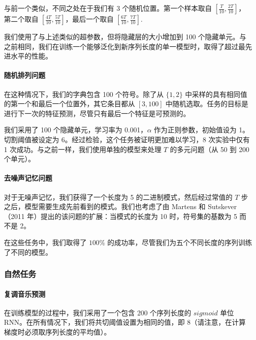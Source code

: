 与前一个类似，不同之处在于我们有 3 个随机位置。第一个样本取自 \([\frac{T}{10},\frac{2T}{10}]\)，第二个取自 \([\frac{4T}{10}, \frac{5T}{10}]\)，最后一个取自 \([\frac{6T}{10},\frac{7T}{10}]\).

我们使用了与上述类似的超参数，但将隐藏层的大小增加到 100 个隐藏单元。与之前相同，我们在训练一个能够泛化到新序列长度的单一模型时，取得了超过最先进水平的性能。

\paragraph{随机排列问题}\label{ux968fux673aux6392ux5217ux95eeux9898}

在这种情况下，我们的字典包含 100 个符号。除了从 \(\{1, 2\}\) 中采样的具有相同值的第一个和最后一个位置外，其它条目都从 \([3,100]\) 中随机选取。任务的目标是进行下一次的特征预测，尽管只有最后一个特征是可预测的。

我们采用了 100 个隐藏单元，学习率为 0.001，\(\alpha\) 作为正则参数，初始值设为 1。切割阈值被设定为 6。经过检验，这个任务被证明更加难以学习，8 次实验中仅有 1 次成功。与之前一样，我们使用单独的模型来处理 \(T\) 的多元问题（从 50 到 200 个单元）。

\paragraph{去噪声记忆问题}\label{ux53bbux566aux58f0ux8bb0ux5fc6ux95eeux9898}

对于无噪声记忆，我们获得了一个长度为 5 的二进制模式，然后经过常值的 \(T\) 步之后，模型需要生成先前看到的模式。我们也考虑了由 Martens 和 Sutskever（2011 年）提出的该问题的扩展：当模式的长度为 10 时，符号集的基数为 5 而不是 2。

在这些任务中，我们取得了 \(100\%\) 的成功率，尽管我们为五个不同长度的序列训练了不同的模型。

\subsubsection{自然任务}\label{ux81eaux7136ux4efbux52a1}

\paragraph{复调音乐预测}\label{ux590dux8c03ux97f3ux4e50ux9884ux6d4b}

在训练模型的过程中，我们采用了一个包含 200 个序列长度的 \(sigmoid\) 单位 RNN。在所有情况下，我们将共切阈值设置为相同的值，即 8（请注意，在计算梯度时必须取序列长度的平均值）。

